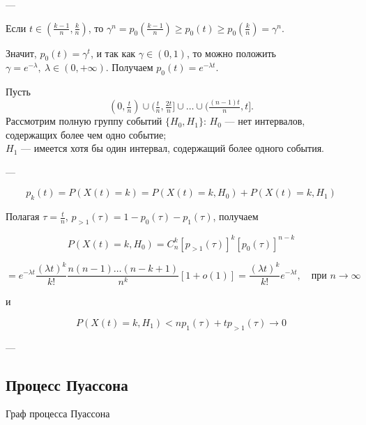 ---

Если $t \in \left( \frac{k-1}{n}, \frac{k}{n} \right)$, то
$\gamma^n = p_0\!\left(\frac{k-1}{n}\right) \ge p_0(t) \ge p_0\!\left(\frac{k}{n}\right) = \gamma^n.$

Значит, $p_0(t) = \gamma^t$, и так как $\gamma \in (0,1)$, то можно положить
$\gamma = e^{-\lambda}, \ \lambda \in (0, +\infty).$
Получаем $p_0(t) = e^{-\lambda t}.$

Пусть
\[
	(0, \tfrac{t}{n}) \cup (\tfrac{t}{n}, \tfrac{2t}{n}] \cup \ldots \cup (\tfrac{(n-1)t}{n}, t].
\]
Рассмотрим полную группу событий $\{H_0, H_1\}$:
$H_0$ — нет интервалов, содержащих более чем одно событие; \\
$H_1$ — имеется хотя бы один интервал, содержащий более одного события.

---

\[
	p_k(t) = P(X(t) = k) = P(X(t) = k, H_0) + P(X(t) = k, H_1)
\]

Полагая \(\tau = \frac{t}{n}\), \(p_{>1}(\tau) = 1 - p_0(\tau) - p_1(\tau)\), получаем

\[
	P(X(t) = k, H_0) = C_n^k [p_{>1}(\tau)]^k [p_0(\tau)]^{n-k}
\]

\[
	= e^{-\lambda t} \frac{(\lambda t)^k}{k!}
	\frac{n (n-1) \ldots (n-k+1)}{n^k}
	[1 + o(1)] = \frac{(\lambda t)^k}{k!} e^{-\lambda t},
	\quad \text{при } n \to \infty
\]

и

\[
	P(X(t) = k, H_1) < np_1(\tau) + t p_{>1}(\tau) \to 0
\]

---

\subsection*{Процесс Пуассона}

Граф процесса Пуассона

\begin{center}
\end{center}



